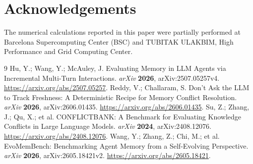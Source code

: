 \documentclass[journal=jcisd8,manuscript=article]{achemso}
\begin{document}
\section*{Acknowledgements}

The numerical calculations reported in this paper were partially performed at Barcelona Supercomputing Center (BSC) and TUBITAK ULAKBIM, High Performance and Grid Computing Center.






\begin{thebibliography}{9}
 Hu, Y.; Wang, Y.; McAuley, J. Evaluating Memory in LLM Agents via Incremental Multi-Turn Interactions. \emph{arXiv} \textbf{2026}, arXiv:2507.05257v4. \url{https://arxiv.org/abs/2507.05257}.
 Reddy, V.; Challaram, S. Don't Ask the LLM to Track Freshness: A Deterministic Recipe for Memory Conflict Resolution. \emph{arXiv} \textbf{2026}, arXiv:2606.01435. \url{https://arxiv.org/abs/2606.01435}.
 Su, Z.; Zhang, J.; Qu, X.; et al. CONFLICTBANK: A Benchmark for Evaluating Knowledge Conflicts in Large Language Models. \emph{arXiv} \textbf{2024}, arXiv:2408.12076. \url{https://arxiv.org/abs/2408.12076}.
 Wang, Y.; Zhang, Z.; Chi, M.; et al. EvoMemBench: Benchmarking Agent Memory from a Self-Evolving Perspective. \emph{arXiv} \textbf{2026}, arXiv:2605.18421v2. \url{https://arxiv.org/abs/2605.18421}.
\end{thebibliography}
\end{document}
